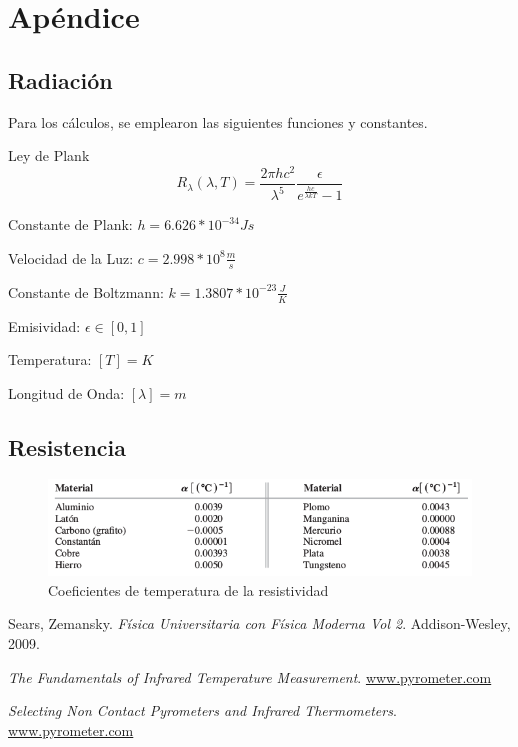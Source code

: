 \documentclass[10pt,a4paper]{article}
\begin{document}
\newpage
\section{Apéndice}
	\subsection{Radiación}\label{apendice_radiacion}
		Para los cálculos, se emplearon las siguientes funciones y constantes.
	
		Ley de Plank
			\begin{equation}\label{f_planck}
				\displaystyle R_{\lambda}(\lambda, T) = \frac{2 \pi h c^2}{\lambda ^5} \frac{\epsilon}{e^ {\frac{hc}{\lambda k T}} - 1}
			\end{equation}
	
			Constante de Plank: $h = 6.626 * 10^{-34} Js$
			
			Velocidad de la Luz: $c = 2.998 * 10^8 \frac{m}{s}$
			
			Constante de Boltzmann: $k = 1.3807 * 10^{-23} \frac{J}{K}$
			
			Emisividad: $\epsilon \in [0,1]$
			
			Temperatura: $[T] = K$
			
		Longitud de Onda: $[\lambda] = m$

	\subsection{Resistencia}\label{apendice_resistencia}
		\begin{figure}[H]
			\centering\includegraphics[scale=0.75]{images/tabla_coeficiente_resistividad.png}\caption{Coeficientes de temperatura de la resistividad}
		\end{figure}

\begin{thebibliography}{1}
		Sears, Zemansky.
		\textit{Física Universitaria con Física Moderna Vol 2}.
		Addison-Wesley, 2009.

		\textit{The Fundamentals of Infrared Temperature Measurement}.
		\href{www.pyrometer.com}{www.pyrometer.com}

		\textit{Selecting Non Contact Pyrometers and Infrared Thermometers}.
		\href{www.pyrometer.com}{www.pyrometer.com}

\end{thebibliography}
\end{document}
